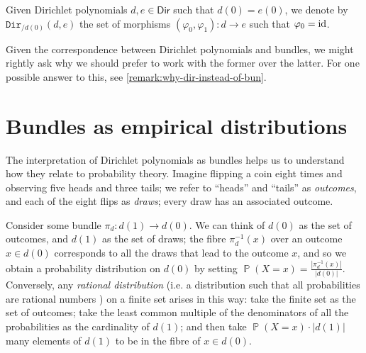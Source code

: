 \documentclass[11pt,fleqn]{article}
\newcommand{\id}{\textnormal{id}}
\newcommand{\cat}[1]{\mathtt{#1}}
\newcommand{\rig}[1]{\mathsf{#1}}
\newcommand{\Dir}{\rig{Dir}}
\newcommand{\cDir}{\cat{Dir}}
\DeclareMathOperator{\prob}{\mathbb{P}}
\begin{document}
\begin{definition}
  Given Dirichlet polynomials $d,e\in\Dir$ such that $d(0)=e(0)$, we denote by $\cDir_{/d(0)}(d,e)$ the set of morphisms $(\varphi_0,\varphi_1)\colon d\to e$ such that $\varphi_0=\id$.
\end{definition}

Given the correspondence between Dirichlet polynomials and bundles, we might rightly ask why we should prefer to work with the former over the latter.
For one possible answer to this, see \cref{remark:why-dir-instead-of-bun}.



\section{Bundles as empirical distributions}
\label{section:bun-and-emp}

The interpretation of Dirichlet polynomials as bundles helps us to understand how they relate to probability theory.
Imagine flipping a coin eight times and observing five heads and three tails;
we refer to ``heads'' and ``tails'' as \emph{outcomes}, and each of the eight flips as \emph{draws};
every draw has an associated outcome.

Consider some bundle $\pi_d\colon d(1)\to d(0)$.
We can think of $d(0)$ as the set of outcomes, and $d(1)$ as the set of draws;
the fibre $\pi_d^{-1}(x)$ over an outcome $x\in d(0)$ corresponds to all the draws that lead to the outcome $x$, and so we obtain a probability distribution on $d(0)$ by setting $\prob(X=x)=\frac{|\pi_d^{-1}(x)|}{|d(0)|}$.
Conversely, any \emph{rational distribution} (i.e. a distribution such that all probabilities are rational numbers ) on a finite set arises in this way:
take the finite set as the set of outcomes;
take the least common multiple of the denominators of all the probabilities as the cardinality of $d(1)$;
and then take $\prob(X=x)\cdot |d(1)|$ many elements of $d(1)$ to be in the fibre of $x\in d(0)$.
\end{document}
